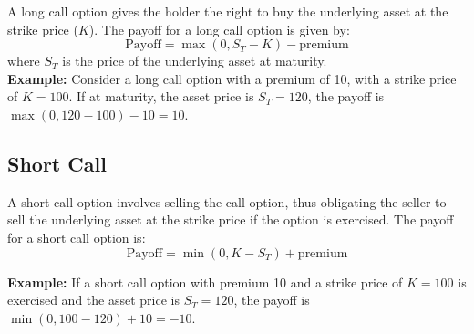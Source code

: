 A long call option gives the holder the right to buy the underlying asset at the strike price (\(K\)). The payoff for a long call option is given by:
\[ \text{Payoff} = \max(0, S_T - K)-\text{premium} \]
where \( S_T \) is the price of the underlying asset at maturity.\\

\textbf{Example:} Consider a long call option with a premium of 10, with a strike price of \( K = 100 \). If at maturity, the asset price is \( S_T = 120 \), the payoff is \( \max(0, 120 - 100) -10 = 10 \).

\begin{figure}[H]
    \centering
{}
\end{figure}

\subsection*{Short Call}

A short call option involves selling the call option, thus obligating the seller to sell the underlying asset at the strike price if the option is exercised. The payoff for a short call option is:
\[ \text{Payoff} = \min(0, K - S_T) + \text{premium} \]

\textbf{Example:} If a short call option with premium 10 and a strike price of \( K = 100 \) is exercised and the asset price is \( S_T = 120 \), the payoff is \( \min(0, 100 - 120) + 10 = -10 \).

\begin{figure}[H]
    \centering
\end{figure}

